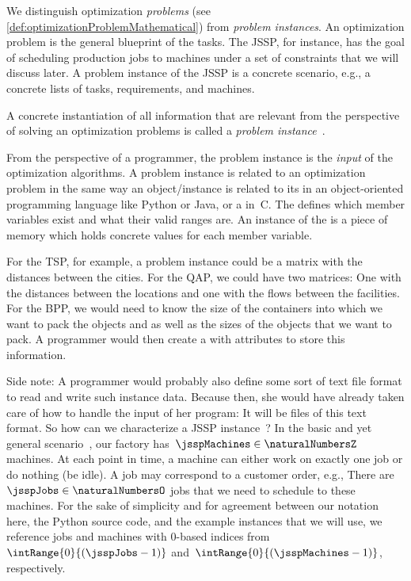 %
\label{sec:problemInstance}%
%
%
%
We distinguish optimization \emph{problems} (see \autoref{def:optimizationProblemMathematical}) from \emph{problem instances}.
An optimization problem is the general blueprint of the tasks.
The \gls{JSSP}, for instance, has the goal of scheduling production jobs to machines under a set of constraints that we will discuss later.
A problem instance of the \gls{JSSP} is a concrete scenario, e.g., a concrete lists of tasks, requirements, and machines.%
%
\begin{definition}%
\label{def:instance}%
A concrete instantiation of all information that are relevant from the perspective of solving an optimization problems is called a \emph{problem instance}~\instance.%
\end{definition}%
%
%
\endhsection%
%
%
From the perspective of a programmer, the problem instance is the \emph{input} of the optimization algorithms.
A problem instance is related to an optimization problem in the same way an object/instance is related to its  in an object-oriented programming language like Python or Java, or a  in~C.
The  defines which member variables exist and what their valid ranges are.
An instance of the  is a piece of memory which holds concrete values for each member variable.%

For the \gls{TSP}, for example, a problem instance could be a matrix with the distances between the cities.
For the \gls{QAP}, we could have two matrices:
One with the distances between the locations and one with the flows between the facilities.
For the \gls{BPP}, we would need to know the size of the containers into which we want to pack the objects and as well as the sizes of the objects that we want to pack.
A programmer would then create a  with attributes to store this information.

Side note:
A programmer would probably also define some sort of text file format to read and write such instance data.
Because then, she would have already taken care of how to handle the input of her program:
It will be files of this text format.%
%
%
%
\endhsection%
%
%
%
\label{sec:jsspInstance}%
%
%
\label{sec:jsspInstanceStructure}%
%
So how can we characterize a \gls{JSSP} instance~\instance?
In the basic and yet general scenario~\cite{GLLRK1979OAAIDSASAS,LLRKS1993SASAAC,L1982RRITTOMS,T1993BFBSP}, our factory has~$\jsspMachines\in\naturalNumbersZ$ machines.
At each point in time, a machine can either work on exactly one job or do nothing (be idle).
A job may correspond to a customer order, e.g., 
There are~$\jsspJobs\in\naturalNumbersO$ jobs that we need to schedule to these machines.
For the sake of simplicity and for agreement between our notation here, the Python source code, and the example instances that we will use, we reference jobs and machines with 0\nobreakdash-based indices from~$\intRange{0}{(\jsspJobs-1)}$ and~$\intRange{0}{(\jsspMachines-1)}$, respectively.

